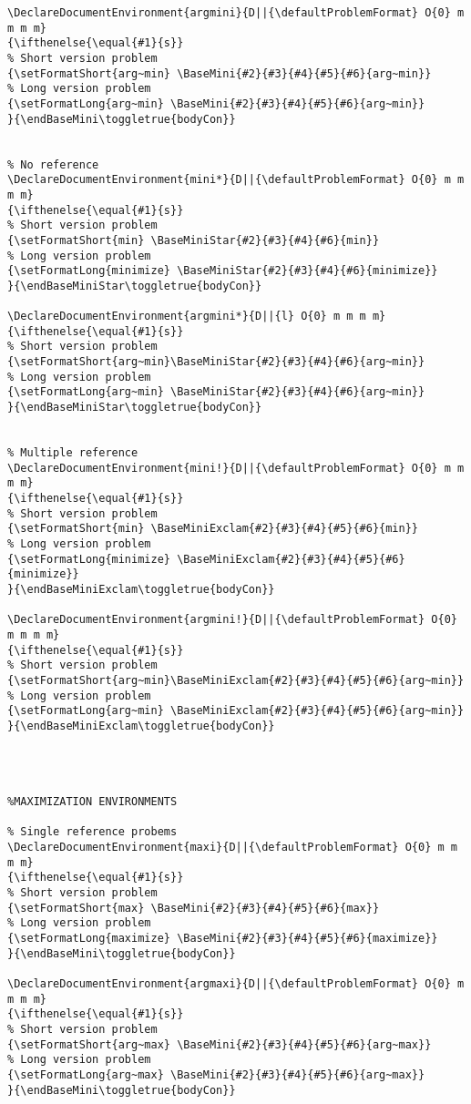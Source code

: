 \documentclass[a4paper]{article}
\begin{document}
\begin{lstlisting}
\DeclareDocumentEnvironment{argmini}{D||{\defaultProblemFormat} O{0} m m m m}
{\ifthenelse{\equal{#1}{s}}
% Short version problem
{\setFormatShort{arg~min} \BaseMini{#2}{#3}{#4}{#5}{#6}{arg~min}}
% Long version problem	
{\setFormatLong{arg~min} \BaseMini{#2}{#3}{#4}{#5}{#6}{arg~min}}
}{\endBaseMini\toggletrue{bodyCon}}


% No reference
\DeclareDocumentEnvironment{mini*}{D||{\defaultProblemFormat} O{0} m m m m}
{\ifthenelse{\equal{#1}{s}}
% Short version problem
{\setFormatShort{min} \BaseMiniStar{#2}{#3}{#4}{#6}{min}}
% Long version problem	
{\setFormatLong{minimize} \BaseMiniStar{#2}{#3}{#4}{#6}{minimize}}
}{\endBaseMiniStar\toggletrue{bodyCon}}

\DeclareDocumentEnvironment{argmini*}{D||{l} O{0} m m m m}
{\ifthenelse{\equal{#1}{s}}
% Short version problem
{\setFormatShort{arg~min}\BaseMiniStar{#2}{#3}{#4}{#6}{arg~min}}
% Long version problem	
{\setFormatLong{arg~min} \BaseMiniStar{#2}{#3}{#4}{#6}{arg~min}}
}{\endBaseMiniStar\toggletrue{bodyCon}}


% Multiple reference
\DeclareDocumentEnvironment{mini!}{D||{\defaultProblemFormat} O{0} m m m m}
{\ifthenelse{\equal{#1}{s}}
% Short version problem
{\setFormatShort{min} \BaseMiniExclam{#2}{#3}{#4}{#5}{#6}{min}}
% Long version problem	
{\setFormatLong{minimize} \BaseMiniExclam{#2}{#3}{#4}{#5}{#6}{minimize}}
}{\endBaseMiniExclam\toggletrue{bodyCon}}

\DeclareDocumentEnvironment{argmini!}{D||{\defaultProblemFormat} O{0} m m m m}
{\ifthenelse{\equal{#1}{s}}
% Short version problem
{\setFormatShort{arg~min}\BaseMiniExclam{#2}{#3}{#4}{#5}{#6}{arg~min}}
% Long version problem	
{\setFormatLong{arg~min} \BaseMiniExclam{#2}{#3}{#4}{#5}{#6}{arg~min}}
}{\endBaseMiniExclam\toggletrue{bodyCon}}




%MAXIMIZATION ENVIRONMENTS

% Single reference probems
\DeclareDocumentEnvironment{maxi}{D||{\defaultProblemFormat} O{0} m m m m}
{\ifthenelse{\equal{#1}{s}}
% Short version problem
{\setFormatShort{max} \BaseMini{#2}{#3}{#4}{#5}{#6}{max}}
% Long version problem	
{\setFormatLong{maximize} \BaseMini{#2}{#3}{#4}{#5}{#6}{maximize}}
}{\endBaseMini\toggletrue{bodyCon}}

\DeclareDocumentEnvironment{argmaxi}{D||{\defaultProblemFormat} O{0} m m m m}
{\ifthenelse{\equal{#1}{s}}
% Short version problem
{\setFormatShort{arg~max} \BaseMini{#2}{#3}{#4}{#5}{#6}{arg~max}}
% Long version problem	
{\setFormatLong{arg~max} \BaseMini{#2}{#3}{#4}{#5}{#6}{arg~max}}
}{\endBaseMini\toggletrue{bodyCon}}



\end{lstlisting}
\end{document}
